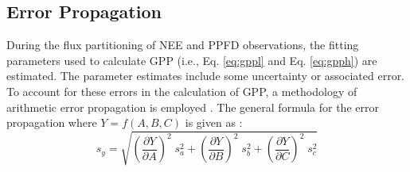 \subsection{Error Propagation}
\label{sec:mst1errprop}
During the flux partitioning of NEE and PPFD observations, the fitting parameters used to calculate GPP (i.e., Eq. \ref{eq:gppl} and Eq. \ref{eq:gpph}) are estimated.  
The parameter estimates include some uncertainty or associated error.  
To account for these errors in the calculation of GPP, a methodology of arithmetic error propagation is employed \parencite{caldwell14}.  
The general formula for the error propagation where $Y=f(A,B,C)$ is given as \parencite{ku66}:
\begin{equation}
\label{eq:errprop}
	s_{y} = \sqrt{
		\left(\frac{\partial Y}{\partial A}\right)^{2}\; s_{a}^{2} +
		\left(\frac{\partial Y}{\partial B}\right)^{2}\; s_{b}^{2} +
		\left(\frac{\partial Y}{\partial C}\right)^{2}\; s_{c}^{2}
		}
\end{equation}

